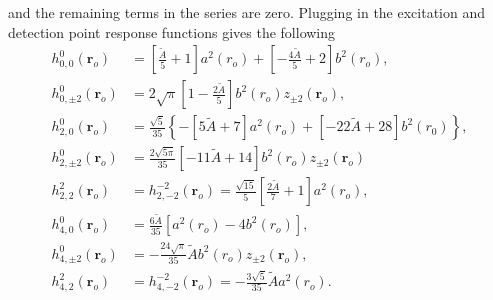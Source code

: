 \documentclass[11pt]{article}
\providecommand{\ro}[1]{\mathbf{\mathbf{r}}_o}
\begin{document}

and the remaining terms in the series are zero. Plugging in the excitation and
detection point response functions gives the following
\begin{align}
  h_{0,0}^0(\ro{}) &= \left[\frac{\tilde{A}}{5} + 1\right]a^2(r_o) + \left[-\frac{4\tilde{A}}{5} + 2\right]b^2(r_o),\\ 
  h_{0,\pm 2}^0(\ro{}) &= 2\sqrt{\pi}\left[1 - \frac{2\tilde{A}}{5}\right]b^2(r_o)z_{\pm 2}(\ro{}),\\ 
  h_{2,0}^0(\ro{}) &= \frac{\sqrt{5}}{35}\left\{-\left[5\tilde{A} + 7\right]a^2(r_o) + \left[-22\tilde{A} + 28\right]b^2(r_0)\right\},\\ 
  h_{2,\pm 2}^0(\ro{}) &= \frac{2\sqrt{5\pi}}{35}\left[-11\tilde{A} + 14\right]b^2(r_o)z_{\pm 2}(\ro{})\\ 
  h_{2,2}^{2}(\ro{}) &= h_{2,-2}^{-2}(\ro{}) = \frac{\sqrt{15}}{5}\left[\frac{2\tilde{A}}{7} + 1\right]a^2(r_o),\\ 
  h_{4,0}^0(\ro{}) &= \frac{6\tilde{A}}{35}\left[a^2(r_o) - 4b^2(r_o)\right],\\ 
  h_{4,\pm 2}^0(\ro{}) &= -\frac{24\sqrt{\pi}}{35}\tilde{A}b^2(r_o)z_{\pm 2}(\ro{}),\\ 
  h_{4,2}^{2}(\ro{}) &= h_{4,-2}^{-2}(\ro{}) = -\frac{3\sqrt{5}}{35}\tilde{A}a^2(r_o). 
\end{align}


\end{document}
